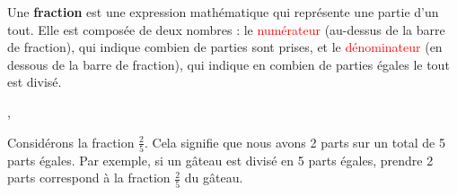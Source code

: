 \documentclass{article}
\begin{document}
\begin{tcolorbox}[colback=cyan!10!white, colframe=red!75!black, title=\textcolor{white}{Définition}, 
                  sharp corners=southwest]
    Une \textbf{fraction} est une expression mathématique qui représente une partie d'un tout. Elle est composée de deux nombres : le \textcolor{red}{numérateur} (au-dessus de la barre de fraction), qui indique combien de parties sont prises, et le \textcolor{red}{dénominateur} (en dessous de la barre de fraction), qui indique en combien de parties égales le tout est divisé.
\end{tcolorbox}

\vspace{0.2cm},
\begin{tcolorbox}[colback=orange!10!white, colframe=orange!75!black, sharp corners=south, boxrule=0.8mm, title=\textcolor{white}{Exemple}]
    Considérons la fraction \(\frac{2}{5}\). Cela signifie que nous avons 2 parts sur un total de 5 parts égales. Par exemple, si un gâteau est divisé en 5 parts égales, prendre 2 parts correspond à la fraction \(\frac{2}{5}\) du gâteau.

    \vspace{10pt}
    \centering
\end{tcolorbox}

\vspace{0.2cm}
\end{document}
